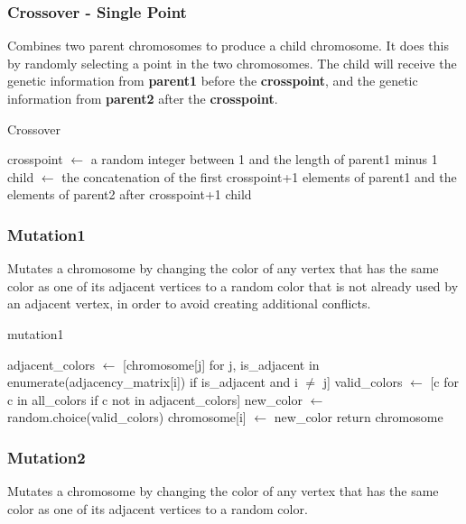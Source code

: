 \documentclass[10pt]{article}
\begin{document}
\subsubsection{Crossover - Single Point}
Combines two parent chromosomes to produce a child chromosome. It does this by randomly selecting a point in the two chromosomes. The child will receive the genetic information from \textbf{parent1} before the \textbf{crosspoint}, and the genetic information from \textbf{parent2} after the \textbf{crosspoint}.

\begin{algorithm}[H]
\caption{Crossover}
\begin{algorithmic}[1]
\State crosspoint $\gets$ a random integer between 1 and the length of parent1 minus 1
\State child $\gets$ the concatenation of the first crosspoint+1 elements of parent1 and the elements of parent2 after crosspoint+1
\State \Return child
\EndProcedure
\end{algorithmic}
\end{algorithm}

\subsubsection{Mutation1}
Mutates a chromosome by changing the color of any vertex that has the same color as one of its adjacent vertices to a random color that is not already used by an adjacent vertex, in order to avoid creating additional conflicts. 

\begin{algorithm}[H]
\caption{mutation1}
\begin{algorithmic}[1]
\State adjacent\_colors $\gets$ [chromosome[j] for j, is\_adjacent in enumerate(adjacency\_matrix[i]) if is\_adjacent and i $\neq$ j]
\State valid\_colors $\gets$ [c for c in all\_colors if c not in adjacent\_colors]
\State new\_color $\gets$ random.choice(valid\_colors)
\State chromosome[i] $\gets$ new\_color
\EndIf
\EndIf
\EndFor
\EndIf
\State return chromosome
\EndProcedure
\end{algorithmic}
\end{algorithm}

\subsubsection{Mutation2}
Mutates a chromosome by changing the color of any vertex that has the same color as one of its adjacent vertices to a random color.
\end{document}
